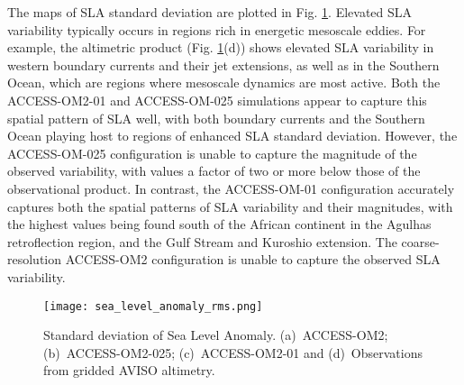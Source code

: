 \documentclass[gmd, manuscript]{copernicus}
\begin{document}
The maps of SLA standard deviation are plotted in Fig. \ref{fig:SL-RMS}.   
Elevated SLA variability typically occurs in regions rich in energetic mesoscale eddies. 
For example, the altimetric product (Fig. \ref{fig:SL-RMS}(d)) shows elevated SLA variability in western boundary currents and their jet extensions, as well as in the Southern Ocean, which are regions where mesoscale dynamics are most active. 
Both the ACCESS-OM2-01 and ACCESS-OM-025 simulations appear to capture this spatial pattern of SLA well, with both boundary currents and the Southern Ocean playing host to regions of enhanced SLA standard deviation. 
However, the ACCESS-OM-025 configuration is unable to capture the magnitude of the observed variability, with values a factor of two or more below those of the observational product. 
In contrast, the ACCESS-OM-01 configuration accurately captures both the spatial patterns of SLA variability and their magnitudes, with the highest values being found south of the African continent in the Agulhas retroflection region, and the Gulf Stream and Kuroshio extension. 
The coarse-resolution ACCESS-OM2 configuration is unable to capture the observed SLA variability. 


\begin{figure}[t]
\texttt{[image: sea\_level\_anomaly\_rms.png]}
\caption{Standard deviation of Sea Level Anomaly. (a)~ACCESS-OM2; (b)~ACCESS-OM2-025; (c)~ACCESS-OM2-01 and (d)~Observations from gridded AVISO altimetry.  
\label{fig:SL-RMS}}
\end{figure}
\end{document}

